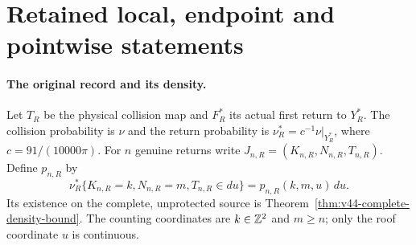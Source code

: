 \section{Retained local, endpoint and pointwise statements}
\label{app:v57-retained-front}


\paragraph{The original record and its density.}
Let $T_R$ be the physical collision map and $F_R^*$ its actual first
return to $Y_R^*$. The collision probability is $\nu$ and the return
probability is $\nu_R^*=c^{-1}\nu|_{Y_R^*}$, where
$c=91/(10000\pi)$. For $n$ genuine returns write
$J_{n,R}=(K_{n,R},N_{n,R},T_{n,R})$. Define $p_{n,R}$ by
\[
 \nu_R^*\{K_{n,R}=k,N_{n,R}=m,T_{n,R}\in du\}
                  =p_{n,R}(k,m,u)\,du.
\]
Its existence on the complete, unprotected source is
Theorem~\ref{thm:v44-complete-density-bound}. The counting coordinates
are $k\in\mathbb Z^2$ and $m\ge n$; only the roof coordinate $u$ is continuous.

